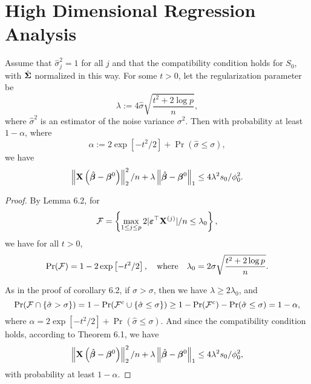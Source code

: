 \chapter{High Dimensional Regression Analysis}

\begin{corollary}
	Assume that $\hat{\sigma}_j^{2}=1$ for all $j$ and that the compatibility condition holds for $S_{0}$, with $\hat{\boldsymbol{\Sigma}}$ normalized in this way. For some $t>0$, let the regularization parameter be
	\begin{equation*}
		\lambda:=4\hat{\sigma}\sqrt{\frac{t^{2}+2\log p}{n}},
	\end{equation*}
	where $\hat{\sigma}^{2}$ is an estimator of the noise variance $\sigma^{2}$. Then with probability at least $1-\alpha$, where
	\begin{equation*}
		\alpha:=2\exp\left[-t^{2}/2\right]+\Pr(\hat{\sigma}\leq\sigma),
	\end{equation*}
	we have
	\begin{equation*}
		\left\|{\bf X}\left(\hat{\boldsymbol{\beta}}-\boldsymbol{\beta}^{0}\right)\right\|_{2}^{2}/n+\lambda\left\|\hat{\boldsymbol{\beta}}-\boldsymbol{\beta}^{0}\right\|_{1}\leq 4 \lambda^{2}s_{0}/\phi_{0}^{2}.
	\end{equation*}
\end{corollary}

\begin{proof}
	By Lemma 6.2, for
	\begin{equation*}
		{\mathcal F}=\left\{\max_{1\leq j\leq p}2|\boldsymbol{\varepsilon}^{\top}{\bf X}^{(j)}|/n\leq\lambda_{0}\right\},
	\end{equation*}
	we have for all $t>0$,
	\begin{equation*}
		\Pr({\mathcal F})=1-2\exp\left[-t^{2}/2\right],\quad\text{where}\quad\lambda_{0}=2\sigma\sqrt{\frac{t^{2}+2\log p}{n}}.
	\end{equation*}

	As in the proof of corollary 6.2, if $\hat{\sigma}>\sigma$, then we have $\lambda\geq 2\lambda_{0}$, and
	\begin{equation*}
		\Pr({\mathcal F}\cap\{\hat{\sigma}>\sigma\})=1-\Pr({\mathcal F}^{c}\cup\{\hat{\sigma}\leq\sigma\})\geq 1-\Pr({\mathcal F}^{c})-\Pr(\hat{\sigma}\leq\sigma)=1-\alpha,
	\end{equation*}
	where $\alpha=2\exp\left[-t^{2}/2\right]+\Pr(\hat{\sigma}\leq\sigma)$. And since the compatibility condition holds, according to Theorem 6.1, we have
	\begin{equation*}
		\left\|{\bf X}\left(\hat{\boldsymbol{\beta}}-\boldsymbol{\beta}^{0}\right)\right\|_{2}^{2}/n+\lambda\left\|\hat{\boldsymbol{\beta}}-\boldsymbol{\beta}^{0}\right\|_{1}\leq 4 \lambda^{2}s_{0}/\phi_{0}^{2},
	\end{equation*}
	with probability at least $1-\alpha$.
\end{proof}
